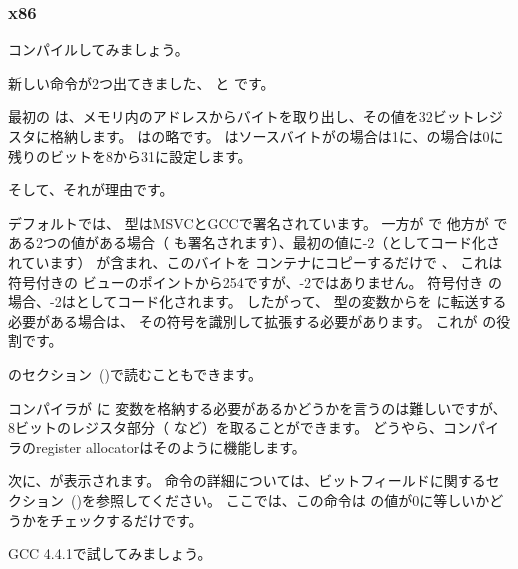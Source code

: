 ﻿\subsubsection{x86}


コンパイルしてみましょう。




新しい命令が2つ出てきました、 \MOVSX と \TEST です。

\label{MOVSX}

最初の \MOVSX は、メモリ内のアドレスからバイトを取り出し、その値を32ビットレジスタに格納します。 
\MOVSX はの略です。 
\MOVSX はソースバイトがの場合は1に、の場合は0に残りのビットを8から31に設定します。

そして、それが理由です。

デフォルトでは、 \Tchar 型はMSVCとGCCで署名されています。 一方が \Tchar で
他方が \Tint である2つの値がある場合（ \Tint も署名されます）、最初の値に-2（としてコード化されています）
が含まれ、このバイトを \Tint コンテナにコピーするだけで 、
これは符号付きの \Tint ビューのポイントから254ですが、-2ではありません。
符号付き \Tint の場合、-2はとしてコード化されます。 
したがって、 \Tchar 型の変数からを \Tint に転送する必要がある場合は、
その符号を識別して拡張する必要があります。 これが \MOVSX の役割です。

\q{\IT{\SignedNumbersSectionName}}のセクション~()で読むこともできます。

コンパイラが \EDX に \Tchar 変数を格納する必要があるかどうかを言うのは難しいですが、
8ビットのレジスタ部分（ \DL など）を取ることができます。 どうやら、コンパイラの\gls{register allocator}はそのように機能します。


次に、が表示されます。 
\TEST 命令の詳細については、ビットフィールドに関するセクション~()を参照してください。 
ここでは、この命令は \EDX の値が0に等しいかどうかをチェックするだけです。


GCC 4.4.1で試してみましょう。




